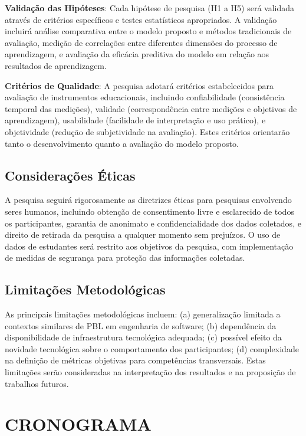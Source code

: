 \documentclass[12pt, a4paper, oneside]{abntex2}
\begin{document}
\textbf{Validação das Hipóteses}: Cada hipótese de pesquisa (H1 a H5) será validada através de critérios específicos e testes estatísticos apropriados. A validação incluirá análise comparativa entre o modelo proposto e métodos tradicionais de avaliação, medição de correlações entre diferentes dimensões do processo de aprendizagem, e avaliação da eficácia preditiva do modelo em relação aos resultados de aprendizagem.

\textbf{Critérios de Qualidade}: A pesquisa adotará critérios estabelecidos para avaliação de instrumentos educacionais, incluindo confiabilidade (consistência temporal das medições), validade (correspondência entre medições e objetivos de aprendizagem), usabilidade (facilidade de interpretação e uso prático), e objetividade (redução de subjetividade na avaliação). Estes critérios orientarão tanto o desenvolvimento quanto a avaliação do modelo proposto.

\subsection{Considerações Éticas}

A pesquisa seguirá rigorosamente as diretrizes éticas para pesquisas envolvendo seres humanos, incluindo obtenção de consentimento livre e esclarecido de todos os participantes, garantia de anonimato e confidencialidade dos dados coletados, e direito de retirada da pesquisa a qualquer momento sem prejuízos. O uso de dados de estudantes será restrito aos objetivos da pesquisa, com implementação de medidas de segurança para proteção das informações coletadas.

\subsection{Limitações Metodológicas}

As principais limitações metodológicas incluem: (a) generalização limitada a contextos similares de PBL em engenharia de software; (b) dependência da disponibilidade de infraestrutura tecnológica adequada; (c) possível efeito da novidade tecnológica sobre o comportamento dos participantes; (d) complexidade na definição de métricas objetivas para competências transversais. Estas limitações serão consideradas na interpretação dos resultados e na proposição de trabalhos futuros.

\section{CRONOGRAMA}
\end{document}
